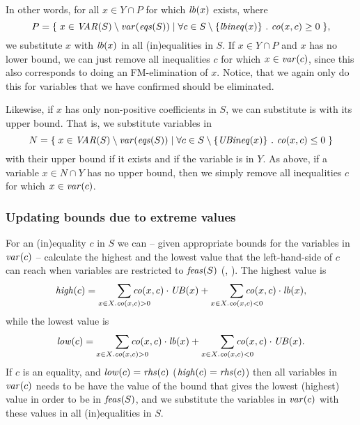 In other words, for all $x\in Y\cap P$ for which $\mathit{lb}(x)$ exists, where 
\[
P=\{\;{x\in \mathit{VAR}(S)\setminus \mathit{var}(\mathit{eqs}(S))}\;|\;{\forall c\in S\setminus\{\mathit{lbineq}(x)\}\ .\ \mathit{co}(x,c)\geq 0}\;\},
\] 
we substitute $x$ with $\mathit{lb}(x)$ in all (in)equalities in $S$. If $x\in Y\cap P$ and $x$ has no lower bound, we can just remove all inequalities $c$ for which $x\in \mathit{var}(c)$, since this also corresponds to doing an FM-elimination of $x$. 
Notice, that we again only do this for variables that we have confirmed should be eliminated. %
	
Likewise, if $x$ has only non-positive coefficients in $S$, we can substitute is with its upper bound. That is, we substitute variables in 
\[
N=\set {x\in \VAR(S)\setminus\var(\eqs(S))}{\forall c\in S\setminus\{\UBc(x)\}\ . \ \coef(x,c)\leq 0}
\] 
with their upper bound if it exists and if the variable is in $Y$. As above, if a variable $x\in N\cap Y$ has no upper bound, then we simply remove all inequalities $c$ for which $x\in \mathit{var}(c)$.
%	
\subsubsection{Updating bounds due to extreme values} For an (in)equality $c$ in $S$ we can -- given appropriate bounds for the variables in $\mathit{var}(c)$ -- calculate the highest and the lowest value that the left-hand-side of $c$ can reach when variables are restricted to $\mathit{feas}(S)$ (\cite{maros}, {\cite{andersen95}}). The highest value is
	\begin{equation}\label{eq:high}
	\mathit{high}(c)=\smashoperator[r]{\sum_{x\in X.\coef(x,c)>0}}\coef(x,c)\cdot\UB(x) + \smashoperator[r]{\sum_{x\in X.\coef(x,c)<0}}\coef(x,c)\cdot\lb(x),
	\end{equation}
	while the lowest value is
	\begin{equation}\label{eq:low}
	\mathit{low}(c)=\smashoperator[r]{\sum_{x\in X.\coef(x,c)>0}}\coef(x,c)\cdot\lb(x) + \smashoperator[r]{\sum_{x\in X.\coef(x,c)<0}}\coef(x,c)\cdot\UB(x).
	\end{equation}
If $c$ is an equality, and %
$\mathit{low}(c) = \mathit{rhs}(c)$ ($\mathit{high}(c) = \mathit{rhs}(c)$) then all variables in $\mathit{var}(c)$ needs to be have the value of the bound that gives the lowest (highest) value in order to be in $\mathit{feas}(S)$, and we substitute the variables in $\mathit{var}(c)$ with these values in all (in)equalities in $S$.

